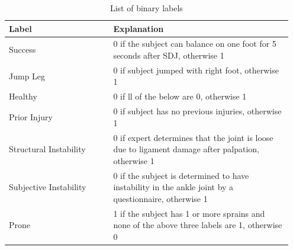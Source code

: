 \begin{table}[!h]
	\centering
	\begin{tabular}{p{0.35\linewidth} | p{0.6\linewidth}}
		\textbf{Label~}        & \textbf{Explanation}                                                                                  \\ \hline
		Success                & 0 if the subject can balance on one foot for 5 seconds after SDJ, otherwise 1                         \\ \hline
		Jump Leg               & 0 if subject jumped with right foot, otherwise 1                                                      \\ \hline
		Healthy                & 0 if ll of the below are 0, otherwise 1                                                              \\ \hline
		Prior Injury           & 0 if subject has no previous injuries, otherwise 1                                                    \\ \hline
		Structural Instability & 0 if expert determines that the joint is loose due to ligament damage after palpation, otherwise 1    \\ \hline
		Subjective Instability & 0 if the subject is determined to have instability in the ankle joint by a questionnaire, otherwise 1 \\ \hline
		Prone                  & 1 if the subject has 1 or more sprains and none of the above three labels are 1, otherwise 0          \\ \hline
	\end{tabular}
	\caption{List of binary labels}
	\label{binary_labels}
\end{table}


